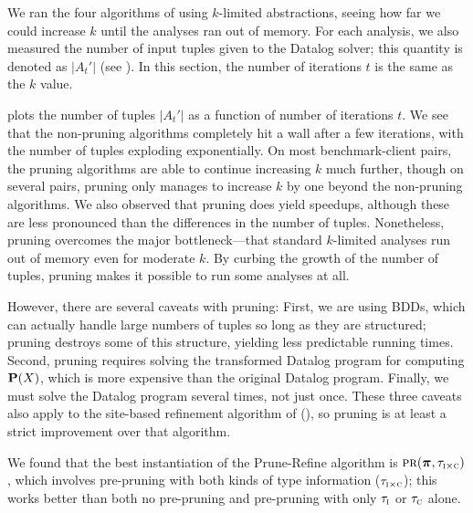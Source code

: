 
We ran the four algorithms of  using $k$-limited abstractions, seeing
how far we could increase $k$ until the analyses ran out of memory.
For each analysis, we also measured the number of input tuples given to
the Datalog solver; this quantity is denoted as $|A_t'|$ (see
).  In this section, the number of iterations $t$ is the same as the $k$ value.

 plots the number of tuples $|A_t'|$ as a function of
number of iterations $t$.  We see that the
non-pruning algorithms completely hit a wall after a few iterations, with the
number of tuples exploding exponentially.  On most benchmark-client pairs, the
pruning algorithms are able to continue increasing $k$ much further, though on several
pairs, pruning only manages to increase $k$ by one beyond the non-pruning algorithms.
We also observed that pruning does yield speedups, although these are
less pronounced than the differences in the number of tuples.  Nonetheless, pruning
overcomes the major bottleneck---that standard $k$-limited analyses run
out of memory even for moderate $k$.  By curbing the growth of the
number of tuples, pruning makes it possible to run some analyses at all.

However, there are several caveats with pruning:
First, we are using BDDs, which can actually handle large numbers of tuples
so long as they are structured; pruning destroys some of this structure,
yielding less predictable running times.  Second, pruning requires solving
the transformed Datalog program for computing $\mathbf{P}(X)$, which is more expensive than the original Datalog program.
Finally, we must solve the Datalog program several times, not just once.
These three caveats also apply to the site-based refinement algorithm of \cite{liang11minimal} (\Site),
so pruning is at least a strict improvement over that algorithm.


We found that the best instantiation of the Prune-Refine algorithm is $\text{\sc pr}(\mbox{\boldmath$\pi$},
\tau_{\text{\sc i} \times \text{\sc c}})$, which involves pre-pruning with both kinds of type information ($\tau_{\text{\sc i} \times \text{\sc c}}$);
this works better than both no pre-pruning and pre-pruning with only
$\tau_{\text{\sc i}}$ or $\tau_{\text{\sc c}}$ alone.

